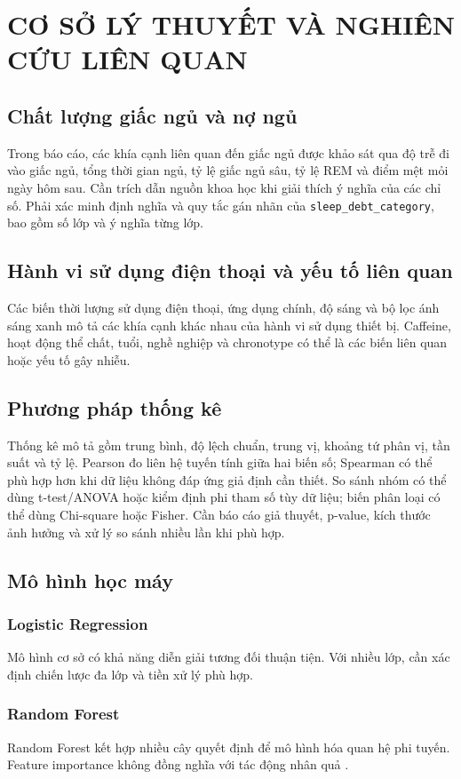 \chapter{CƠ SỞ LÝ THUYẾT VÀ NGHIÊN CỨU LIÊN QUAN}
\section{Chất lượng giấc ngủ và nợ ngủ}
Trong báo cáo, các khía cạnh liên quan đến giấc ngủ được khảo sát qua độ trễ đi vào giấc ngủ, tổng thời gian ngủ, tỷ lệ giấc ngủ sâu, tỷ lệ REM và điểm mệt mỏi ngày hôm sau. Cần trích dẫn nguồn khoa học khi giải thích ý nghĩa của các chỉ số. Phải xác minh định nghĩa và quy tắc gán nhãn của \texttt{sleep\_debt\_category}, bao gồm số lớp và ý nghĩa từng lớp.
\section{Hành vi sử dụng điện thoại và yếu tố liên quan}
Các biến thời lượng sử dụng điện thoại, ứng dụng chính, độ sáng và bộ lọc ánh sáng xanh mô tả các khía cạnh khác nhau của hành vi sử dụng thiết bị. Caffeine, hoạt động thể chất, tuổi, nghề nghiệp và chronotype có thể là các biến liên quan hoặc yếu tố gây nhiễu.
\section{Phương pháp thống kê}
Thống kê mô tả gồm trung bình, độ lệch chuẩn, trung vị, khoảng tứ phân vị, tần suất và tỷ lệ. Pearson đo liên hệ tuyến tính giữa hai biến số; Spearman có thể phù hợp hơn khi dữ liệu không đáp ứng giả định cần thiết. So sánh nhóm có thể dùng t-test/ANOVA hoặc kiểm định phi tham số tùy dữ liệu; biến phân loại có thể dùng Chi-square hoặc Fisher. Cần báo cáo giả thuyết, p-value, kích thước ảnh hưởng và xử lý so sánh nhiều lần khi phù hợp.
\section{Mô hình học máy}
\subsection{Logistic Regression}
Mô hình cơ sở có khả năng diễn giải tương đối thuận tiện. Với nhiều lớp, cần xác định chiến lược đa lớp và tiền xử lý phù hợp.
\subsection{Random Forest}
Random Forest kết hợp nhiều cây quyết định để mô hình hóa quan hệ phi tuyến. Feature importance không đồng nghĩa với tác động nhân quả \citep{breiman2001randomforest}.
